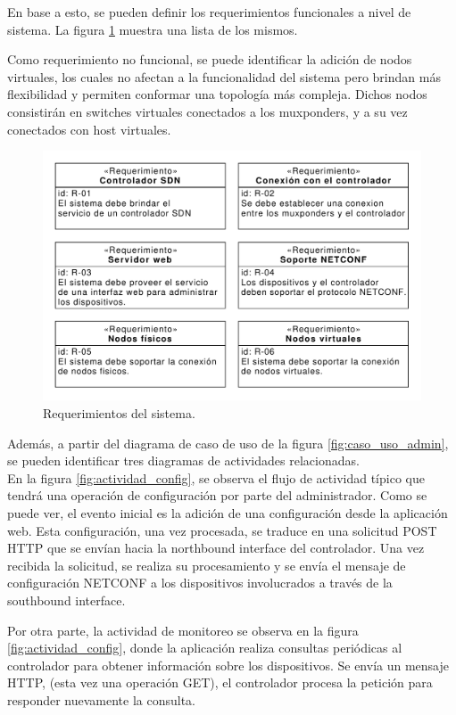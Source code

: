   En base a esto, se pueden definir los requerimientos funcionales a nivel de sistema. La figura \ref{fig:req_sys} muestra una lista de los mismos. 
  
  Como requerimiento no funcional, se puede identificar la adición de nodos virtuales, los cuales no afectan a la funcionalidad del sistema pero brindan más flexibilidad y permiten conformar una topología más compleja. Dichos nodos consistirán en switches virtuales conectados a los muxponders, y a su vez conectados con host virtuales.

  \begin{figure}[H]
    \centering
    \includegraphics[scale=0.65]{Figures/req_sys.pdf}
    \caption{Requerimientos del sistema.}
    \label{fig:req_sys}
  \end{figure}


  Además, a partir del diagrama de caso de uso de la figura \ref{fig:caso_uso_admin}, se pueden identificar tres diagramas de actividades relacionadas. 
  \\

  En la figura \ref{fig:actividad_config}, se observa el flujo de actividad típico que tendrá una operación de configuración por parte del administrador. Como se puede ver, el evento inicial es la adición de una configuración desde la aplicación web. Esta configuración, una vez procesada, se traduce en una solicitud POST HTTP que se envían hacia la northbound interface del controlador. Una vez recibida la solicitud, se realiza su procesamiento y se envía el mensaje de configuración NETCONF a los dispositivos involucrados a través de la southbound interface.

  Por otra parte, la actividad de monitoreo se observa en la figura \ref{fig:actividad_config}, donde la aplicación realiza consultas periódicas al controlador para obtener información sobre los dispositivos. Se envía un mensaje HTTP, (esta vez una operación GET), el controlador procesa la petición para responder nuevamente la consulta.

